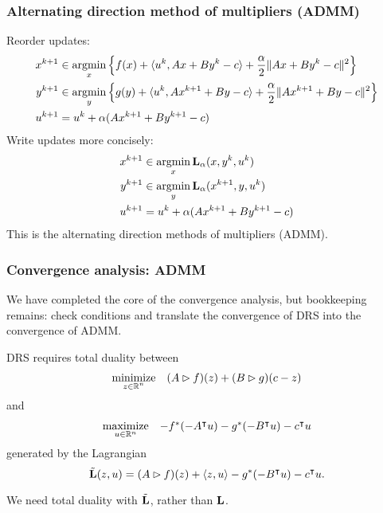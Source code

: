 \documentclass[10pt,mathserif]{beamer}
\begin{document}
\begin{frame}
\frametitle{Alternating direction method of multipliers (ADMM)}
Reorder updates:
\begin{align*}
x^{k+1}&\in\operatorname*{argmin}_{x}\left\{
f(x)+\langle u ^k,Ax+By^k-c\rangle+
\frac{\alpha}{2}\|Ax+By^k-c\|^2
\right\}\\
y^{k+1}&\in\operatorname*{argmin}_{y}\left\{ g(y)
+\langle u ^k,Ax^{k+1}+By-c\rangle+
\frac{\alpha}{2}\|Ax^{k+1}+By-c\|^2\right\}\\
 u ^{k+1}&= u ^k+\alpha (Ax^{k+1}+By^{k+1}-c)
\end{align*}
Write updates more concisely:
\begin{align*}
x^{k+1}&\in\argmin_{x}\lagrange_{\alpha}(x,y^k,u ^k) \\%
y^{k+1}&\in\argmin_{y}\lagrange_{\alpha}(x^{k+1},y,u ^k)\\%
 u ^{k+1}&= u ^k+\alpha (Ax^{k+1}+By^{k+1}-c)%
\end{align*}
This is the alternating direction methods of multipliers (ADMM).
\end{frame}

\begin{frame}
\frametitle{Convergence analysis: ADMM}


We have completed the core of the convergence analysis, but bookkeeping remains: check conditions and translate the convergence of DRS into the convergence of ADMM.

\vspace{0.2in}



DRS requires total duality between
\[
\begin{array}{ll}
\underset{\substack{z\in\mathbb{R}^n}}{\mbox{minimize}}&
(A\rhd f)(z)+(B\rhd g)(c-z)
\end{array}
\]
and
\[
\begin{array}{ll}
\underset{u  \in \mathbb{R}^n}{\mbox{maximize}}&-f^*(-A^\intercal u )-g^*(-B^\intercal u )-c^\intercal u
\end{array}
\]
generated by the Lagrangian
\[
\tilde{\mathbf{L}}(z,u )=(A\rhd f)(z)+\langle z,u\rangle -g^*(-B^\intercal u )-c^\intercal u.
\]


\vspace{0.2in}
We need total duality with $\tilde{\mathbf{L}}$, rather than $\mathbf{L}$.
\end{frame}
\end{document}

